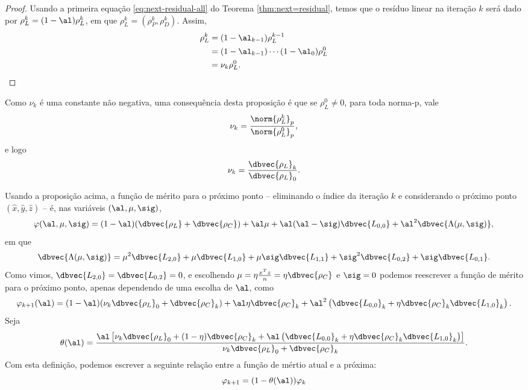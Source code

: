 \begin{proof}
	Usando a primeira equação \eqref{eq:next-residual-all} do Teorema \ref{thm:next=residual},  temos que  o resíduo linear na iteração $k$ será dado por $\rho_L^{k} = (1-\al)\rho_L^{k}$, em que $\rho_L^{k} = (\rho_P^{k},\rho_D^{k})$. Assim, 
	\begin{align*}
		\rho_L^{k} & = (1-\al_{k-1})\rho_L^{k-1}\notag\\
				   & = (1-\al_{k-1})\cdots(1-\al_{0})\rho_L^{0}\notag\\
				   & = \nu_k \rho_L^{0}.
	\end{align*}
\end{proof}
Como  $\nu_k$ é uma constante não negativa,  uma consequência desta proposição é que se $\rho_L^0\neq 0 $, para toda norma-p, vale 
\[
\nu_k = \frac{\norm{\rho_L^{k}}_p}{\norm{\rho_L^{0}}_p},
\]
e logo
\[
\nu_k = \frac{\dbvec{\rho_L}_k}{\dbvec{\rho_L}_0}.
\]


Usando a proposição acima, a função de mérito para o próximo ponto --  eliminando o índice da iteração $k$ e considerando o próximo ponto $(\hat{x},\hat{y},\hat{z})$ --  é, nas variáveis  $(\al,\mu,\sig)$,
\begin{equation}
{\varphi}(\al,\mu,\sig) = (1-\al)(\dbvec{\rho_L} +
\dbvec{\rho_C}) + \al\mu + \al(\al-\sig)\dbvec{L_{0,0}} +
\al^2\dbvec{\Lambda(\mu,\sig)} ,
\end{equation}
em que 
\[
\dbvec{\Lambda(\mu,\sig)} = \mu^2
 \dbvec{L_{2,0}} + \mu \dbvec{L_{1,0}} + 	\mu \sig \dbvec{L_{1,1}} +
 \sig^2 \dbvec{L_{0,2}} + \sig \dbvec{L_{0,1}}.
 \]
Como vimos, $\dbvec{L_{2,0}} = \dbvec{L_{0,2}} = 0$, e escolhendo $\mu = \eta\frac{x^Tz}{n} = \eta\dbvec{\rho_C} $
 e $\sig=0$ podemos reescrever a função de mérito para o próximo ponto, apenas dependendo de uma escolha de  $\al$, como
\[
{\varphi}_{k+1}(\al)  = (1-\al)(\nu_{k}\dbvec{\rho_L}_0 +
\dbvec{\rho_C}_{k}) + \al\eta\dbvec{\rho_C}_{k} + \al^2\left(\dbvec{L_{0,0}}_{k} + \eta\dbvec{\rho_C}_{k} \dbvec{L_{1,0}}_{k}
\right) .
\]
Seja 
\begin{equation}
	\label{eq:theta}
\theta(\al) =  \dfrac{\al\left[ \nu_{k}\dbvec{\rho_L}_0 + (1-\eta)\dbvec{\rho_C}_{k} + \al\left(\dbvec{L_{0,0}}_{k} + \eta\dbvec{\rho_C}_{k} \dbvec{L_{1,0}}_{k}
\right) \right]}{\nu_{k}\dbvec{\rho_L}_0 +
\dbvec{\rho_C}_{k}}.
\end{equation}
Com esta definição, podemos escrever a seguinte relação entre a função de mértio atual e a próxima:
\begin{equation}
	\label{eq:relation-phi-next-phi}
	 			{\varphi}_{k+1} = (1- \theta(\al))\varphi_{k}
\end{equation}


